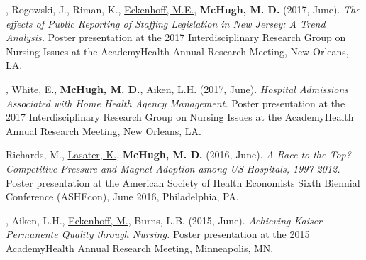 \documentclass[10pt,]{article}
\begin{document}
{{{{{{{{{{{{{{{\begin{hangparas}{.25in}{1}

, Rogowski, J., Riman, K., {\underline {Eckenhoff, M.E.}}, {\textbf {McHugh, M. D.}} (2017, June). {\textit {The effects of Public Reporting of Staffing Legislation in New Jersey: A Trend Analysis.}} Poster presentation at the 2017 Interdisciplinary Research Group on Nursing Issues at the AcademyHealth Annual Research Meeting, New Orleans, LA.

\end{hangparas}

\vspace{4mm}

\begin{hangparas}{.25in}{1}

, {\underline {White, E.}}, {\textbf {McHugh, M. D.}}, Aiken, L.H. (2017, June). {\textit {Hospital Admissions Associated with Home Health Agency Management.}} Poster presentation at the 2017 Interdisciplinary Research Group on Nursing Issues at the AcademyHealth Annual Research Meeting, New Orleans, LA.

\end{hangparas}

\vspace{4mm}

\begin{hangparas}{.25in}{1}

\*Richards, M., {\underline {Lasater, K.}}, {\textbf {McHugh, M. D.}} (2016, June). {\textit {A Race to the Top? Competitive Pressure and Magnet Adoption among US Hospitals, 1997-2012.}} Poster presentation at the American Society of Health Economists Sixth Biennial Conference (ASHEcon), June 2016, Philadelphia, PA.

\end{hangparas}

\vspace{4mm}

\begin{hangparas}{.25in}{1}

, Aiken, L.H., {\underline {Eckenhoff, M.}}, Burns, L.B. (2015, June). {\textit {Achieving Kaiser Permanente Quality through Nursing.}} Poster presentation at the 2015 AcademyHealth Annual Research Meeting, Minneapolis, MN.

\end{hangparas}

\vspace{4mm}

}}}}}}}}}}}}}}}
\end{document}
